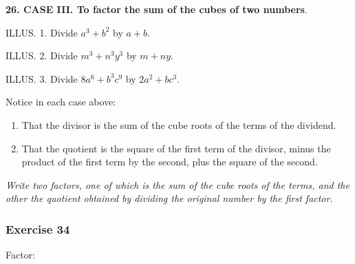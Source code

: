 \documentclass{book}
\begin{document}
\textbf{ 26. CASE III. To factor the sum of the cubes of two
numbers}.

ILLUS. 1. Divide $a^3 + b^2$ by $a + b$.

ILLUS. 2. Divide $m^3 + n^3y^3$ by $m + ny$.

ILLUS. 3. Divide $8a^6 + b^3c^9$ by $2a^2 + bc^3$.

Notice in each case above:
\begin{enumerate}
\item That the divisor is the sum of the cube roots of the terms
of the dividend.

\item That the quotient is the square of the first term of the
divisor, minus the product of the first term by the second, plus
the square of the second.
\end{enumerate}

\textit{ Write two factors, one of which is the sum of the cube
roots of the terms, and the other the quotient obtained by
dividing the original number by the first factor}.

\subsubsection*{Exercise 34}

Factor:
\end{document}
